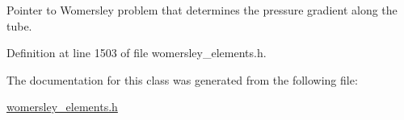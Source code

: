 Pointer to Womersley problem that determines the pressure gradient along the tube. 



Definition at line 1503 of file womersley\+\_\+elements.\+h.



The documentation for this class was generated from the following file\+:\begin{DoxyCompactItemize}
\item 
\hyperlink{womersley__elements_8h}{womersley\+\_\+elements.\+h}\end{DoxyCompactItemize}
